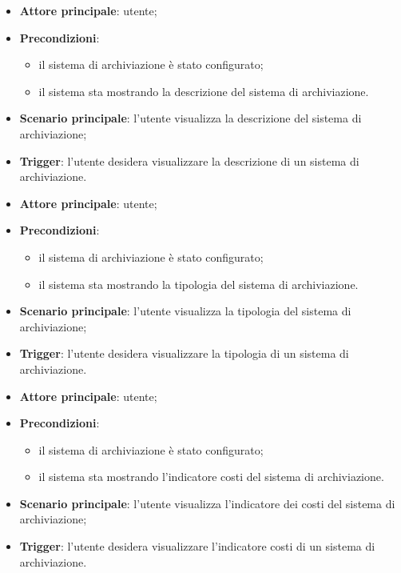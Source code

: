 \documentclass[10pt, a4paper]{article}
\begin{document}
    \begin{itemize}
        \item \textbf{Attore principale}: utente;
        \item \textbf{Precondizioni}:
        \begin{itemize}
            \item il sistema di archiviazione è stato configurato;
            \item il sistema sta mostrando la descrizione del sistema di archiviazione.
        \end{itemize}
        \item \textbf{Scenario principale}: l'utente visualizza la descrizione del sistema di archiviazione;
        \item \textbf{Trigger}: l’utente desidera visualizzare la descrizione di un sistema di archiviazione.
    \end{itemize}

    \begin{itemize}
        \item \textbf{Attore principale}: utente;
        \item \textbf{Precondizioni}:
        \begin{itemize}
            \item il sistema di archiviazione è stato configurato;
            \item il sistema sta mostrando la tipologia del sistema di archiviazione.
        \end{itemize}
        \item \textbf{Scenario principale}: l'utente visualizza la tipologia del sistema di archiviazione;
        \item \textbf{Trigger}: l’utente desidera visualizzare la tipologia di un sistema di archiviazione.
    \end{itemize}

    \begin{itemize}
        \item \textbf{Attore principale}: utente;
        \item \textbf{Precondizioni}:
        \begin{itemize}
            \item il sistema di archiviazione è stato configurato;
            \item il sistema sta mostrando l'indicatore costi del sistema di archiviazione.
        \end{itemize}
        \item \textbf{Scenario principale}: l'utente visualizza l'indicatore dei costi del sistema di archiviazione;
        \item \textbf{Trigger}: l’utente desidera visualizzare l'indicatore costi di un sistema di archiviazione.
    \end{itemize}
\end{document}
